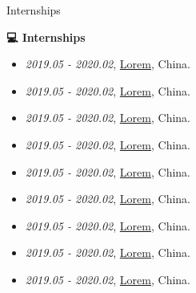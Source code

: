 \begin{section}{Internships}
\label{sec:internships}

\begin{center}
\huge{\textbf{💻 Internships}}
\end{center}

\begin{itemize}
  \item \textit{2019.05 - 2020.02}, \href{https://github.com/}{Lorem}, China.
  \item \textit{2019.05 - 2020.02}, \href{https://github.com/}{Lorem}, China.
  \item \textit{2019.05 - 2020.02}, \href{https://github.com/}{Lorem}, China.
  \item \textit{2019.05 - 2020.02}, \href{https://github.com/}{Lorem}, China.
  \item \textit{2019.05 - 2020.02}, \href{https://github.com/}{Lorem}, China.
  \item \textit{2019.05 - 2020.02}, \href{https://github.com/}{Lorem}, China.
  \item \textit{2019.05 - 2020.02}, \href{https://github.com/}{Lorem}, China.
  \item \textit{2019.05 - 2020.02}, \href{https://github.com/}{Lorem}, China.
  \item \textit{2019.05 - 2020.02}, \href{https://github.com/}{Lorem}, China.
\end{itemize}
\end{section} 